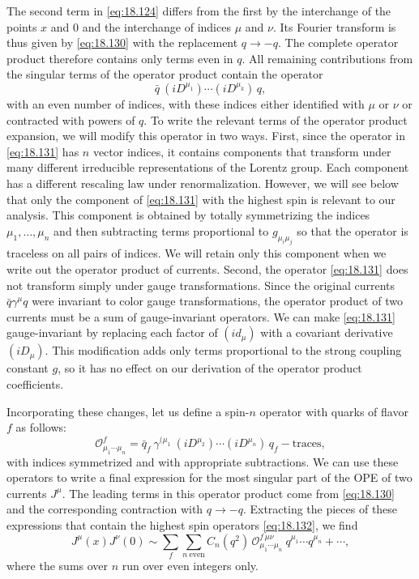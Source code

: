 The second term in \eqref{eq:18.124} differs from the first by the
interchange of the points $x$ and 0 and the interchange of indices $\mu$ and
$\nu$.  Its Fourier transform is thus given by \eqref{eq:18.130} with the
replacement $q\to -q$.  The complete operator product therefore contains
only terms even in $q$.  All remaining contributions from the singular terms
of the operator product contain the operator
\begin{equation}
  \bar{q}\ (iD^{\mu_1})\cdots(iD^{\mu_k})\,q ,
  \label{eq:18.131}
\end{equation}
with an even number of indices, with these indices either identified with
$\mu$ or $\nu$ or contracted with powers of $q$.  To write the relevant terms
of the operator product expansion, we will modify this operator in two ways.
First, since the operator in \eqref{eq:18.131} has $n$ vector indices, it
contains components that transform under many different irreducible
representations of the Lorentz group.  Each component has a different
rescaling law under renormalization.  However, we will see below that only
the component of \eqref{eq:18.131} with the highest spin is relevant to our
analysis.  This component is obtained by totally symmetrizing the indices
$\mu_1, \ldots, \mu_n$ and then subtracting terms proportional to
$g_{\mu_i\mu_j}$ so that the operator is traceless on all pairs of indices.
We will retain only this component when we write out the operator product of
currents.  Second, the operator \eqref{eq:18.131} does not transform simply
under gauge transformations.  Since the original currents
$\bar{q}\gamma^\mu q$ were invariant to color gauge transformations, the
operator product of two currents must be a sum of gauge-invariant operators.
We can make \eqref{eq:18.131} gauge-invariant by replacing each factor of
$(id_{\mu})$ with a covariant derivative $(iD_\mu)$.  This modification adds
only terms proportional to the strong coupling constant $g$, so it has no
effect on our derivation of the operator product coefficients.

Incorporating these changes, let us define a spin-$n$ operator with quarks of
flavor $f$ as follows:
\begin{equation}
  \mathcal{O}^{f}_{\mu_1\cdots\mu_n} = \bar{q}_f\ \gamma^{(\mu_1}\
    (iD^{\mu_2})\cdots(iD^{\mu_n})\,q_f - \text{traces} ,
  \label{eq:18.132}
\end{equation}
with indices symmetrized and with appropriate subtractions.  We can use these
operators to write a final expression for the most singular part of the OPE
of two currents $J^\mu$.  The leading terms in this operator product come
from \eqref{eq:18.130} and the corresponding contraction with $q\to -q$.
Extracting the pieces of these expressions that contain the highest spin
operators \eqref{eq:18.132}, we find
\begin{equation}
  J^\mu(x)J^\nu(0) \sim \sum_f \sum_{n\ \text{even}} C_n(q^2)\,
    \mathcal{O}^{f\,\mu\nu}_{\mu_1\cdots\mu_n}\ q^{\mu_1}\cdots q^{\mu_n}
    + \cdots ,
  \label{eq:18.133}
\end{equation}
where the sums over $n$ run over even integers only.

